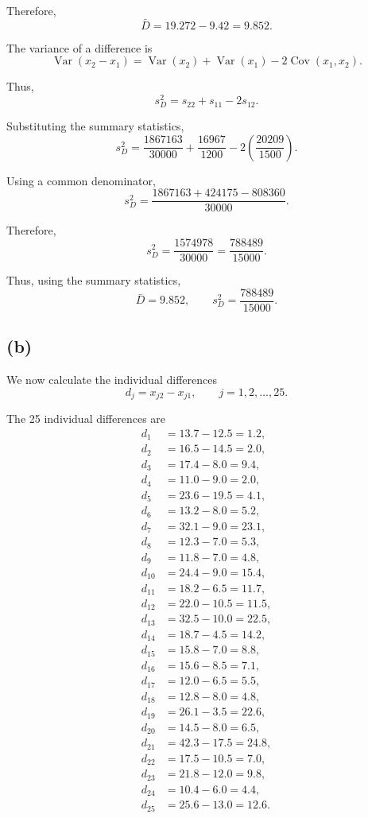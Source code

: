 \documentclass[12pt]{article}
\begin{document}
	Therefore,
	\[
	\bar{D}
	=
	19.272-9.42
	=
	\boxed{9.852}.
	\]
	
	The variance of a difference is
	\[
	\operatorname{Var}(x_2-x_1)
	=
	\operatorname{Var}(x_2)
	+
	\operatorname{Var}(x_1)
	-
	2\operatorname{Cov}(x_1,x_2).
	\]
	
	Thus,
	\[
	s_D^2
	=
	s_{22}+s_{11}-2s_{12}.
	\]
	
	Substituting the summary statistics,
	\[
	s_D^2
	=
	\frac{1867163}{30000}
	+
	\frac{16967}{1200}
	-
	2\left(\frac{20209}{1500}\right).
	\]
	
	Using a common denominator,
	\[
	s_D^2
	=
	\frac{1867163+424175-808360}{30000}.
	\]
	
	Therefore,
	\[
	s_D^2
	=
	\frac{1574978}{30000}
	=
	\boxed{\frac{788489}{15000}}.
	\]
	
	Thus, using the summary statistics,
	\[
	\boxed{
		\bar{D}=9.852,
		\qquad
		s_D^2=\frac{788489}{15000}}.
	\]
	
	\subsection*{(b)}
	
	We now calculate the individual differences
	\[
	d_j=x_{j2}-x_{j1},
	\qquad
	j=1,2,\ldots,25.
	\]
	
	The 25 individual differences are
	\[
	\begin{aligned}
		d_1&=13.7-12.5=1.2,\\
		d_2&=16.5-14.5=2.0,\\
		d_3&=17.4-8.0=9.4,\\
		d_4&=11.0-9.0=2.0,\\
		d_5&=23.6-19.5=4.1,\\
		d_6&=13.2-8.0=5.2,\\
		d_7&=32.1-9.0=23.1,\\
		d_8&=12.3-7.0=5.3,\\
		d_9&=11.8-7.0=4.8,\\
		d_{10}&=24.4-9.0=15.4,\\
		d_{11}&=18.2-6.5=11.7,\\
		d_{12}&=22.0-10.5=11.5,\\
		d_{13}&=32.5-10.0=22.5,\\
		d_{14}&=18.7-4.5=14.2,\\
		d_{15}&=15.8-7.0=8.8,\\
		d_{16}&=15.6-8.5=7.1,\\
		d_{17}&=12.0-6.5=5.5,\\
		d_{18}&=12.8-8.0=4.8,\\
		d_{19}&=26.1-3.5=22.6,\\
		d_{20}&=14.5-8.0=6.5,\\
		d_{21}&=42.3-17.5=24.8,\\
		d_{22}&=17.5-10.5=7.0,\\
		d_{23}&=21.8-12.0=9.8,\\
		d_{24}&=10.4-6.0=4.4,\\
		d_{25}&=25.6-13.0=12.6.
	\end{aligned}
	\]
	
\end{document}
